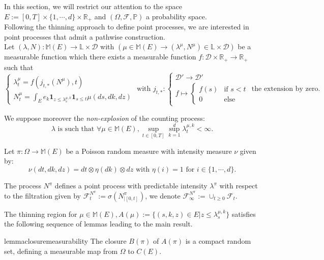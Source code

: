 \documentclass{article} %
\newcommand{\1}{\mathbbm{1}} %
\newcommand{\R}{\mathbb{R}}
\newcommand{\ind}{\mathbf{1}}
\begin{document}
In this section, we will restrict our attention to the space $E := [0,T] \times \{ 1,\cdots,d\} \times \R_+$ and $(\Omega, \mathcal{F}, \mathbb{P})$ a probability space.\\
Following the thinning approach to define point processes, we are interested in point processes that admit a pathwise construction. \\
Let $(\lambda, N): \mathbb{M}(E) \to \mathbb{L} \times \mathcal{D}$ with $(\mu \in \mathbb{M}(E) \to (\lambda^\mu, N^\mu) \in \mathbb{L} \times \mathcal{D})$ be a measurable function which there exists a measurable function $f: \mathcal{D} \times \R_+ \to \R_+$ such that
\begin{equation*}
\begin{cases} 
    \lambda^\mu_t = f(j_{t,*}(N^\mu), t) \\
    N^\mu_t = \int_{E} e_k \ind_{z \leq \lambda^{\mu,k}_s} \ind_{s \leq t} \mu(ds, dk, dz)
\end{cases}
\text{ with } 
j_{t,*} \colon \begin{cases} 
    \mathcal{D}' \to \mathcal{D}' \\
    f \mapsto \begin{cases} f(s) & \text{if } s < t \\ 0 & \text{else} \end{cases}
\end{cases}
\text{the extension by zero.}
\end{equation*}

We suppose moreover the \textit{non-explosion} of the counting process:
$$\lambda \text{ is such that } \forall \mu \in \mathbb{M}(E), \sup_{t \in [0,T]} \sup_{k=1}^d \lambda^{\mu,k}_t < \infty.$$

Let $\pi: \Omega \to \mathbb{M}(E)$ be a Poisson random measure with intensity measure $\nu$ given by:
$$\nu(dt,dk,dz) = dt \otimes \eta(dk) \otimes dz \text{ with } \eta({i}) = 1 \text{ for } i \in \{ 1,\cdots,d\}.$$

The process $N^\pi$ defines a point process with predictable intensity $\lambda^\pi$ with respect to the filtration given by $\mathcal{F}^{N^\pi}_t := \sigma(N^\pi_{|[0,t]})$, we denote $\mathcal{F}^{N^\pi}_\infty := \cup_{t \geq 0} \mathcal{F}_t$.

The thinning region for $\mu \in \mathbb{M}(E), A(\mu) := \{ (s,k,z) \in E | z \leq \lambda^{\mu,k}_s \}$ satisfies the following sequence of lemmas leading to the main result.

\begin{restatable}{lemma}{closuremeasurability}
    \label{lem:closuremeasurability}
    The closure $B(\pi)$ of $A(\pi)$ is a compact random set, defining a measurable map from $\Omega$ to $C(E)$.
\end{restatable}
\end{document}
